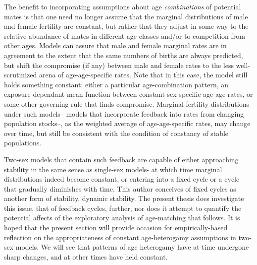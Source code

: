 The benefit to incorporating assumptions about age \textit{combinations} of
potential mates is that one need no longer assume that the marginal
distributions of male and female fertility are constant, but rather that
they adjust in some way to the relative abundance of mates in different
age-classes and/or to competition from other ages. Models can assure
that male and female marginal rates are in agreement to the extent that 
the same numbers of births are always predicted, but shift the
compromise (if any) between male and female rates to the less well-scrutinized
arena of age-age-specific rates. Note that in this case, the model still holds something
constant: either a particular age-combination pattern, an exposure-dependant
mean function between constant sex-specific age-age-rates, or some other governing rule that finds
compromise. Marginal fertility distributions under such models-- models that
incorporate feedback into rates from changing population stocks--, as the
weighted average of age-age-specific rates, may change over time, but still 
be consistent with the condition of constancy of stable populations.

Two-sex models that contain such feedback are capable of either approaching
stability in the same sense as single-sex models- at which time marginal
distributions indeed become constant, or entering into a fixed
cycle or a cycle that gradually diminishes with time\citep{chung1994cycles}.
This author conceives of fixed cycles as another form of stability, dynamic 
stability. The present thesis does investigate 
this issue, that of feedback cycles, further, nor does it attempt to
quantify the potential affects of the exploratory analysis of age-matching that
follows. It is hoped that the present section will provide
occasion for empirically-based reflection on the appropriateness of
constant age-heterogamy assumptions in two-sex models. We will see that patterns
of age heterogamy have at time undergone sharp changes, and at other times have
held constant.

